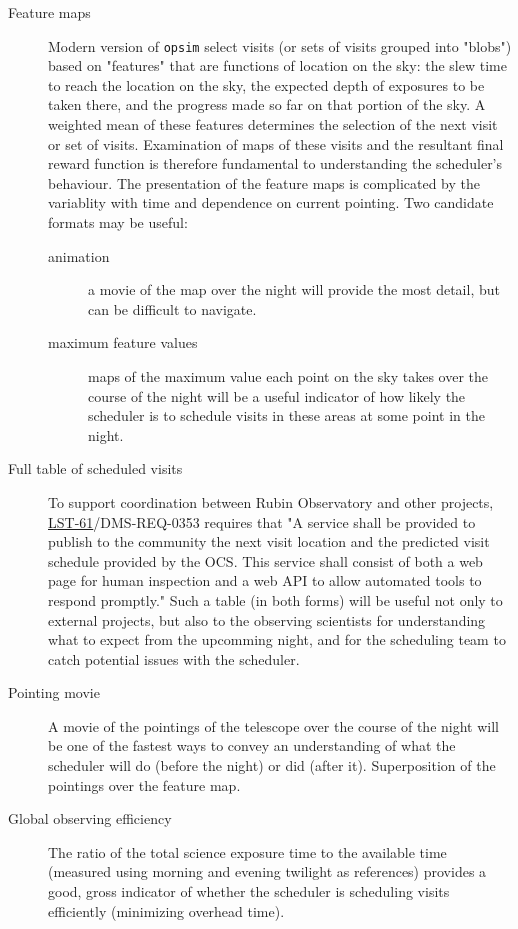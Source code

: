 \begin{description}
\item[{Feature maps}] Modern version of \texttt{opsim} select visits (or sets of visits grouped into "blobs") based on "features" that are functions of location on the sky: the slew time to reach the location on the sky, the expected depth of exposures to be taken there, and the progress made so far on that portion of the sky. A weighted mean of these features determines the selection of the next visit or set of visits. Examination of maps of these visits and the resultant final reward function is therefore fundamental to understanding the scheduler's behaviour. The presentation of the feature maps is complicated by the variablity with time and dependence on current pointing. Two candidate formats may be useful:
\begin{description}
\item[{animation}] a movie of the map over the night will provide the most detail, but can be difficult to navigate.
\item[{maximum feature values}] maps of the maximum value each point on the sky takes over the course of the night will be a useful indicator of how likely the scheduler is to schedule visits in these areas at some point in the night.
\end{description}
\item[{Full table of scheduled visits}] To support coordination between Rubin Observatory and other projects, \href{https://ls.st/lse-61}{LST-61}/DMS-REQ-0353 requires that "A service shall be provided to publish to the community the next visit location and the predicted visit schedule provided by the OCS. This service shall consist of both a web page for human inspection and a web API to allow automated tools to respond promptly." Such a table (in both forms) will be useful not only to external projects, but also to the observing scientists for understanding what to expect from the upcomming night, and for the scheduling team to catch potential issues with the scheduler.
\item[{Pointing movie}] A movie of the pointings of the telescope over the course of the night will be one of the fastest ways to convey an understanding of what the scheduler will do (before the night) or did (after it). Superposition of the pointings over the feature map.
\item[{Global observing efficiency}] The ratio of the total science exposure time to the available time (measured using morning and evening twilight as references) provides a good, gross indicator of whether the scheduler is scheduling visits efficiently (minimizing overhead time).

\end{description}
